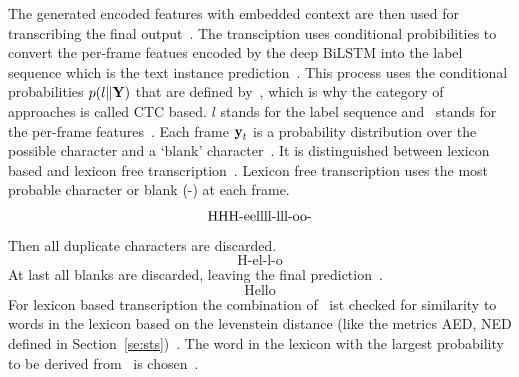 The generated encoded features with embedded context are then used for transcribing the final
output~\citep{shi_end--end_2017}.
The transciption uses conditional probibilities to convert the per-frame featues encoded by the
deep \ac{BiLSTM} into the label sequence which is the text instance
prediction~\citep{shi_end--end_2017}.
This process uses the conditional probabilities $p(l\|\textbf{Y})$ that are defined
by~\cite{graves_connectionist_2006}, which is why the category of approaches is called
\ac{CTC} based.
$l$ stands for the label sequence and \Y\ stands for the per-frame features~\citep{shi_end--end_2017}.
Each frame $\textbf{y}_t$ is a probability distribution over the possible character and a `blank'
character~\citep{shi_end--end_2017,graves_connectionist_2006}.
It is distinguished between lexicon based and lexicon free transcription~\citep{shi_end--end_2017}.
Lexicon free transcription uses the most probable character or blank (-) at each frame.
\[\text{HHH-eellll-lll-\-oo-\-\-}\]
Then all duplicate characters are discarded.
\[\text{H-el-l-o}\]
At last all blanks are discarded, leaving the final prediction~\citep{shi_end--end_2017}.
\[\text{Hello}\]
For lexicon based transcription the combination of \Y\ ist checked for similarity to words in the
lexicon based on the levenstein distance (like the metrics \ac{AED}, \ac{NED} defined in
Section~\ref{se:sts})~\citep{shi_end--end_2017}.
The word in the lexicon with the largest probability to be derived from \Y\ is
chosen~\citep{shi_end--end_2017}.

